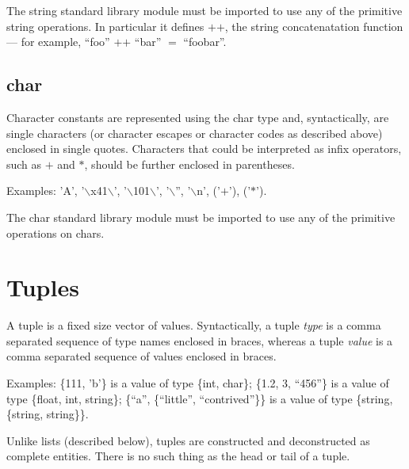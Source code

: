 \documentclass[a4paper,11pt,notitlepage,onecolumn]{book}
\begin{document}
The \textsf{string} standard library module must be imported to use any of the
primitive \textsf{string} operations.  In particular it defines \textsf{{\ensuremath{+}}{\ensuremath{+}}}, the string
concatenatation function --- for example, \textsf{``foo'' {\ensuremath{+}}{\ensuremath{+}} ``bar'' {\ensuremath{=}} ``foobar''}.

\subsection*{\textsf{char}}

Character constants are represented using the \textsf{char} type and,
syntactically, are single characters (or character escapes or character
codes as described above) enclosed in single quotes.  Characters that could
be interpreted as infix operators, such as \textsf{{\ensuremath{+}}} and \textsf{{\ensuremath{*}}}, should be further
enclosed in parentheses.

Examples: \textsf{'A'}, \textsf{'{\ensuremath{\backslash}}x41{\ensuremath{\backslash}}'}, \textsf{'{\ensuremath{\backslash}}101{\ensuremath{\backslash}}'}, \textsf{'{\ensuremath{\backslash}}''}, \textsf{'{\ensuremath{\backslash}}n'}, \textsf{('{\ensuremath{+}}')}, \textsf{('{\ensuremath{*}}')}.


The \textsf{char} standard library module must be imported to use any of the
primitive operations on \textsf{char}s.



\section{Tuples}

A tuple is a fixed size vector of values.  Syntactically, a tuple
\emph{type} is a comma separated sequence of type names enclosed in braces,
whereas a tuple \emph{value} is a comma separated sequence of values enclosed in
braces.

Examples:
\textsf{{\{}111, 'b'{\}}} is a value of type \textsf{{\{}int, char{\}}};
\textsf{{\{}1.2, 3, ``456''{\}}} is a value of type \textsf{{\{}float, int, string{\}}};
\textsf{{\{}``a'', {\{}``little'', ``contrived''{\}}{\}}} is a value of type
\textsf{{\{}string, {\{}string, string{\}}{\}}}.

\Note Unlike lists (described below), tuples are constructed
and deconstructed as complete entities.  There is no such thing as the head
or tail of a tuple.  
\end{document}
